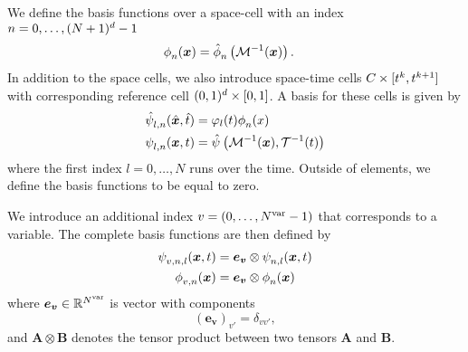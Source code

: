 We define the basis functions over a space-cell with an index $n = 0, \ldots, (N+1)^d - 1$
\begin{align}\label{eq:space-basis}
  \begin{split}
  \sbasis[][n] (\bm{x}) &= \sbasisRef[][n] \left( \mapping^{-1}(\bm{x}) \right).
  \end{split}
\end{align}
In addition to the space cells, we also introduce space-time cells $C_{} \times [t^k, t^{k+1}]$ with corresponding reference cell $(0,1)^d \times  [0,1]$.
A basis for these cells is given by
\begin{align}\label{eq:space-time-basis}
  \begin{split}
  \stbasisRef[][l,n](\hat{\bm{x}}, \hat{t}) &= \lagrange[l](t) \sbasis[][n] (x)\\
  \stbasis[][l,n] (\bm{x}, t) &= \stbasisRef \left( \mapping^{-1}(\bm{x}), \timeMapping^{-1}(t) \right)
  \end{split}
\end{align}
where the first index $l = 0, \ldots, N$ runs over the time.
Outside of elements, we define the basis functions to be equal to zero.

We introduce an additional index $v = (0, \ldots, N^{\text{var}} - 1)$ that corresponds to a variable.
The complete basis functions are then defined by
\begin{align}
  \begin{split}
    \stbasis[][v,n,l] (\bm{x},t) &= \bm{e_v} \otimes \stbasis[][n,l] (\bm{x}, t) \\
    \sbasis[][v,n] (\bm{x}) &= \bm{e_v} \otimes \sbasis[][n] (\bm{x})
  \end{split}
\end{align}
where $\bm{e_v} \in \mathbb{R}^{N^{\text{var}}}$ is vector with components
\begin{equation}
  \left( \bm{e_v} \right)_{v'} = \delta_{v v'},
\end{equation}
and $\bm{A} \otimes \bm{B}$ denotes the tensor product between two tensors $\bm{A}$ and $\bm{B}$.

